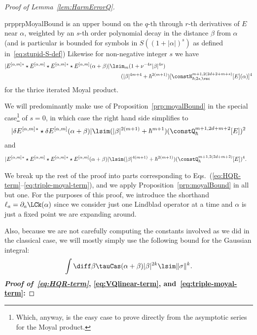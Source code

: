 \documentclass{article}
\numberwithin{equation}{section}
\begin{document}
\begin{proof}[Proof of Lemma~\ref{lem:HarmErrorQ}]
\begin{restatable}{prp}{prpMoyalBound}
		is an upper bound on the $q$-th through $r$-th derivatives 
		of $E$ near $\alpha$, weighted by an $s$-th order polynomial decay in the distance $\beta$ from $\alpha$
  (and is particular is bounded for symbols
  in $S((1+|\alpha|)^s)$ as defined in~\eqref{eq:stupid-S-def})
		Likewise for non-negative integer $s$ we have
		\begin{align}
			\label{eq:FFFF-poly-bd-new}
			\begin{split}
				|E^{[\alpha,m]}{}^*\star E^{[\alpha,m]}\star E^{[\alpha,m]}{}^*\star E^{[\alpha,m]}(\alpha+\beta)|
				&\lsim_m
				(1+\nu^{-4s}|\beta|^{4s}) \\
    &\qquad (|\beta|^{4m+4} + \hbar^{2(m+1)})
				[\constN_{\hbar;2s,\vsc}^{m+1,2(2d+2+m+s)}[E](\alpha)]^4
			\end{split}
		\end{align}
		for the thrice iterated Moyal product.
	\end{restatable}
	
	We will predominantly make use of Proposition~\ref{prp:moyalBound} in the special case\footnote{Which, anyway, is the easy case to prove directly from the asymptotic series for the Moyal product.} of $s=0$, in which case the right hand side simplifies to 
	\begin{align}
		\label{eq:remainder-moyal-bd-szero}
		|\delta E^{[\alpha,m]} {}^*\star \delta E^{[\alpha,m]}(\alpha+\beta)| 
		\lsim
		(|\beta|^{2(m+1)} + \hbar^{m+1})
		(\constQ^{m+1,2d+m+2}_{\hbar}[E])^2
	\end{align}
	and 
	\begin{align}
		\label{eq:FFFF-poly-bd-new-szero}
		\begin{split}
			&|E^{[\alpha,m]}{}^*\star E^{[\alpha,m]}\star E^{[\alpha,m]}{}^*\star E^{[\alpha,m]}(\alpha+\beta)| 
			\lsim
			(|\beta|^{4(m+1)} + \hbar^{2(m+1)})
			(\constQ^{m+1,2(2d+m+2)}_{\hbar}[E])^4.
	\end{split}
\end{align}





We break up the rest of the proof into parts corresponding to Eqs.~(\ref{eq:HQR-term}--\ref{eq:triple-moyal-term}), and we apply Proposition~\ref{prp:moyalBound} in all but one.
For the purposes of this proof, we introduce the shorthand $\ell_a = \partial_a \LCk(\alpha)$ since we consider just one Lindblad operator at a time and $\alpha$ is just a fixed point we are expanding around.

Also, because we are not carefully computing the constants involved as we did in the classical case, we will mostly simply use the 
following bound for the Gaussian integral:
\begin{equation}
\label{eq:crude-gaussian-bd}
    \int \diff\beta \tauCas(\alpha+\beta) |\beta|^{2k} \lsim \|\sigma\|^k.
\end{equation}
\noindent\textbf{\textit{Proof of~\eqref{eq:HQR-term}}, \eqref{eq:VQlinear-term}, and~\eqref{eq:triple-moyal-term}:}


\end{proof}
\end{document}
